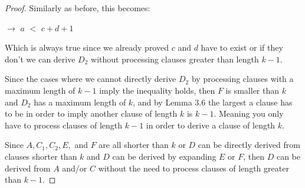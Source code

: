 \documentclass[manuscript]{acmart}
\begin{document}
\begin{proof}
        Similarly as before, this becomes:

        $\rightarrow$ $a$ $<$ $c + d + 1$

        Which is always true since we already proved $c$ and $d$ have to exist
        or if they don't we can derive $D_2$ without processing clauses
        greater than length $k-1$. 

        Since the cases where we cannot directly derive $D_2$ by processing
        clauses with a maximum length of $k-1$ imply the inequality holds, then
        $F$ is smaller than $k$ and $D_2$ has a maximum length of $k$, 
        and by Lemma 3.6 the largest a clause has to be in order to imply
        another clause of length $k$ is $k-1$. Meaning you only have to process
        clauses of length $k-1$ in order to derive a clause of length $k$.
        
        Since $A, C_1, C_2, E,$ and $F$ are all shorter than $k$ or
        $D$ can be directly derived from clauses shorter than $k$ 
        and $D$ can
        be derived by expanding $E$ or $F$, then $D$ can be derived from $A$
        and/or $C$ without the need to process clauses of length greater than $k - 1$.
    \end{proof}

        







\end{document}
